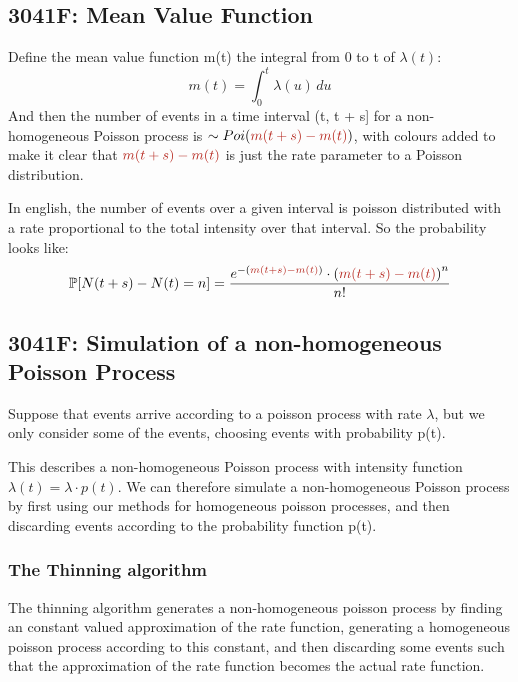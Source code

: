 \documentclass[12pt]{article}
\begin{document}
    \subsection{3041F: Mean Value Function}
    Define the mean value function m(t) the integral from 0 to t of \(\lambda(t)\):
    \begin{equation*}
        m(t) = \int_{0}^{t} \lambda(u) \, du
    \end{equation*}
    And then the number of events in a time interval (t, t + s] for a non-homogeneous Poisson 
    process is \(\sim Poi({\color{BrickRed}{m(t + s) - m(t)}})\), with 
    colours added to make it clear that \({\color{BrickRed}{m(t + s) - m(t)}}\) is just the 
    rate parameter to a Poisson distribution.

    In english, the number of events over a given interval is poisson 
    distributed with a rate proportional to the total intensity over that interval. So the probability looks like:
    \begin{equation*}
        \begin{aligned}
            \mathbb{P}[N(t + s) - N(t) = n] &= \frac{
                e^{-\left({\color{BrickRed}{m(t+s) - m(t)}}\right)} 
                \cdot \left( {\color{BrickRed}{m(t+s) - m(t)}}\right)^n
            }{n!} \\
        \end{aligned}
    \end{equation*}
    \subsection{3041F: Simulation of a non-homogeneous Poisson Process}
    Suppose that events arrive according to a poisson process with rate \(\lambda\), but we only consider some of the events, choosing events with probability p(t).\newline \newline

    This describes a non-homogeneous Poisson process with intensity function \(\lambda(t) = \lambda \cdot p(t)\). 
    We can therefore simulate a non-homogeneous Poisson process by first using our methods for homogeneous poisson processes, and then discarding events according to the probability function p(t).  \newline \newline

    \subsubsection{The Thinning algorithm}
    The thinning algorithm generates a non-homogeneous poisson process by finding an constant valued 
    approximation of the rate function, generating a homogeneous poisson process according to this 
    constant, and then discarding some events such that the approximation of the rate function 
    becomes the actual rate function.
\end{document}
